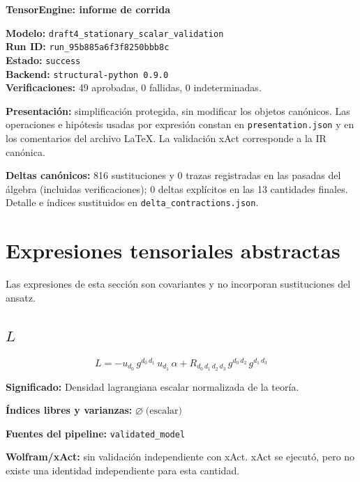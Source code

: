 \documentclass[11pt]{article}
\begin{document}
\begin{center}
{\Large\bfseries TensorEngine: informe de corrida}
\end{center}
\textbf{Modelo:} \texttt{draft4\_stationary\_scalar\_validation}\\
\textbf{Run ID:} \texttt{run\_95b885a6f3f8250bbb8c}\\
\textbf{Estado:} \texttt{success}\\
\textbf{Backend:} \texttt{structural-python 0.9.0}\\
\textbf{Verificaciones:} 49 aprobadas, 0 fallidas, 0 indeterminadas.
\par\smallskip
\textbf{Presentación:} simplificación protegida, sin modificar los objetos canónicos. Las operaciones e hipótesis usadas por expresión constan en \texttt{presentation.json} y en los comentarios del archivo LaTeX. La validación xAct corresponde a la IR canónica.\par
\textbf{Deltas canónicos:} 816 sustituciones y 0 trazas registradas en las pasadas del álgebra (incluidas verificaciones); 0 deltas explícitos en las 13 cantidades finales. Detalle e índices sustituidos en \texttt{delta\_contractions.json}.\par
\section*{Expresiones tensoriales abstractas}
Las expresiones de esta sección son covariantes y no incorporan sustituciones del ansatz.
\subsection*{$ L $}
\begin{dmath*}[breakdepth={5}]
L = -u{}_{d_{0}}\,g{}^{d_{0}\,d_{1}}\,u{}_{d_{1}}\,\alpha + R{}_{d_{0}\,d_{1}\,d_{2}\,d_{3}}\,g{}^{d_{0}\,d_{2}}\,g{}^{d_{1}\,d_{3}}
\end{dmath*}
\par\vspace{1.2\baselineskip}\noindent
\begin{minipage}{\linewidth}
\textbf{Significado:} Densidad lagrangiana escalar normalizada de la teoría.\par
\textbf{Índices libres y varianzas:} $ \varnothing\;\text{(escalar)} $\par
\textbf{Fuentes del pipeline:} \texttt{validated\_model}\par
\textbf{Wolfram/xAct:} sin validación independiente con xAct. xAct se ejecutó, pero no existe una identidad independiente para esta cantidad.\par
\end{minipage}
\end{document}
